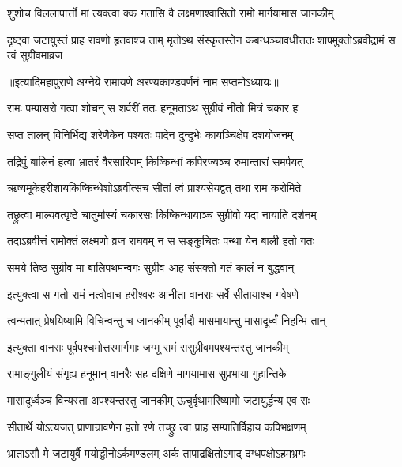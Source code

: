 \twolineshloka
{शुशोच विललापार्त्तो मां त्यक्त्वा क्क गतासि वै}
{लक्ष्मणाश्वासितो रामो मार्गयामास जानकीम्}%

\threelineshloka
{दृष्ट्वा जटायुस्तं प्राह रावणो हृतवांश्च ताम्}
{मृतोऽथ संस्कृतस्तेन कबन्धञ्चावधीत्ततः}
{शापमुक्तोऽब्रवीद्रामं स त्वं सुग्रीवमाव्रज} %

॥इत्यादिमहापुराणे अग्नेये रामायणे अरण्यकाण्डवर्णनं नाम सप्तमोऽध्यायः॥





\twolineshloka
{रामः पम्पासरो गत्वा शोचन् स शर्वरीं ततः}
{हनूमताऽथ सुग्रीवं नीतो मित्रं चकार ह}%

\twolineshloka
{सप्त तालन् विनिर्भिद्य शरेणैकेन पश्यतः}
{पादेन दुन्दुभेः कायञ्चिक्षेप दशयोजनम्}%

\twolineshloka
{तद्रिपुं बालिनं हत्वा भ्रातरं वैरसारिणम्}
{किष्किन्धां कपिरज्यञ्च रुमान्तारां समर्पयत्}%

\twolineshloka
{ऋष्यमूकेहरीशायकिष्किन्धेशोऽब्रवीत्सच }
{सीतां त्वं प्राश्यसेयद्वत् तथा राम करोमिते}%

\twolineshloka
{तछ्रुत्वा माल्यवत्पृष्ठे चातुर्मास्यं चकारसः}
{किष्किन्धायाञ्च सुग्रीवो यदा नायाति दर्शनम्}%

\twolineshloka
{तदाऽब्रवीत्तं रामोक्तं लक्ष्मणो व्रज राघवम्}
{न स सङ्कुचितः पन्था येन बाली हतो गतः}%

\twolineshloka
{समये तिष्ठ सुग्रीव मा बालिपथमन्वगः}
{सुग्रीव आह संसक्तो गतं कालं न बुद्धवान्}%

\twolineshloka
{इत्युक्त्वा स गतो रामं नत्वोवाच हरीश्वरः}
{आनीता वानराः सर्वे सीतायाश्च गवेषणे}%

\twolineshloka
{त्वन्मतात् प्रेषयिष्यामि विचिन्वन्तु च जानकीम् }
{पूर्वादौ मासमायान्तु मासादूर्ध्वं निहन्मि तान्}%

\twolineshloka
{इत्युक्ता वानराः पूर्वपश्चमोत्तरमार्गगाः}
{जग्मू रामं ससुग्रीवमपश्यन्तस्तु जानकीम्}%

\twolineshloka
{रामाङ्गुलीयं संगृह्य हनूमान् वानरैः सह}
{दक्षिणे मागयामास सुप्रभाया गुहान्तिके}%

\twolineshloka
{मासादूर्ध्वञ्च विन्यस्ता अपश्यन्तस्तु जानकीम्}
{ऊचुर्वृथामरिष्यामो जटायुर्द्धन्य एव सः}%

\twolineshloka
{सीतार्थे योऽत्यजत् प्राणान्रावणेन हतो रणे}
{तच्छ्रु त्वा प्राह सम्पातिर्विहाय कपिभक्षणम्}%

\twolineshloka
{भ्राताऽसौ मे जटायुर्वै मयोड्डीनोऽर्कमण्डलम्}
{अर्क तापाद्रक्षितोऽगाद् दग्धपक्षोऽहमभ्रगः}%

